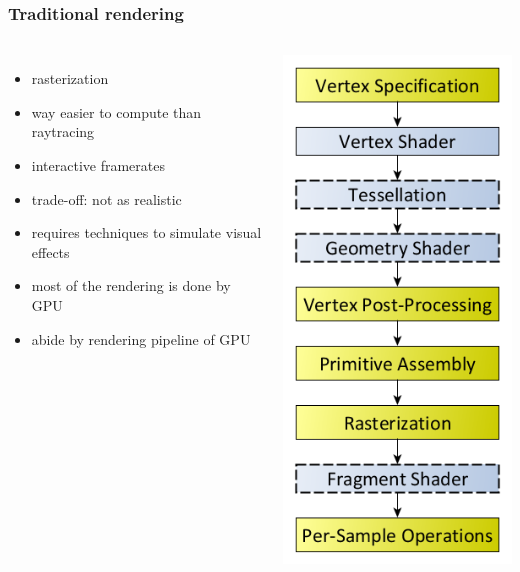 \documentclass[aspectratio=169]{beamer}
\begin{document}
	\begin{frame}
		\frametitle{Traditional rendering}
		\begin{columns}
				\begin{itemize}
					\item rasterization
					\item way easier to compute than raytracing
					\item interactive framerates
					\item trade-off: not as realistic
					\item requires techniques to simulate visual effects
					\item most of the rendering is done by GPU
					\item abide by rendering pipeline of GPU
				\end{itemize}
				\includegraphics[height=.7\textheight]{img/graphics_pipeline.png}
		\end{columns}
	\end{frame}
\end{document}
